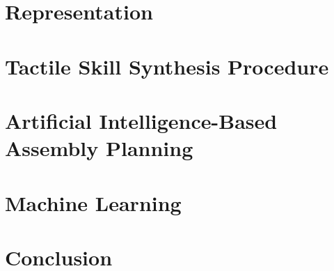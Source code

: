 
\section{Representation}\label{ch:foundations:representation}

\section{Tactile Skill Synthesis Procedure}\label{ch:foundations:synthesis}

\section{Artificial Intelligence-Based Assembly Planning}\label{ch:foundations:planning}

\section{Machine Learning}\label{ch:foundations:learning}

\section{Conclusion}\label{ch:foundations:conclusion}
